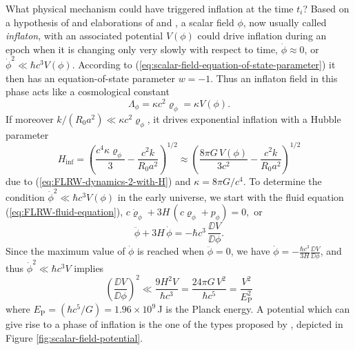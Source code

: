 What physical mechanism could have triggered inflation at the time $t_i$? Based on a hypothesis of \textcite{Guth-1981} and elaborations of \textcite{Linde-1982} and \textcite{Albrecht-Steinhard-1982}, a scalar field $\phi$, now usually called \emph{inflaton}, with an associated potential $V(\phi)$ could drive inflation 
during an epoch when it is changing only very slowly with respect to time, $\dot{\phi} \approx 0$, or $\dot{\phi}^2 \ll \hbar c^3 V(\phi)$. According to (\ref{eq:scalar-field-equation-of-state-parameter}) it then has an equation-of-state parameter $w=-1$. Thus an inflaton field in this phase acts like a cosmological constant
\begin{equation}
	\Lambda_\phi = \kappa c^2 \varrho_\phi = \kappa V(\phi)
	.
\end{equation}
If moreover $k/(R_0 a^2) \ll \kappa c^2 \varrho_\phi$, it drives exponential inflation with a Hubble parameter
\begin{equation}
	H_{\mathrm{inf}}
	= \left( \frac{c^4 \kappa \varrho_\phi}{3} - \frac{c^2 k}{R_0 a^2} \right)^{1/2}
	\approx \left( \frac{8 \pi G \, V(\phi)}{3 c^2} - \frac{c^2 k}{R_0 a^2} \right)^{1/2}
	\label{eq:inflation-Hubble-parameter}
\end{equation}
due to (\ref{eq:FLRW-dynamics-2-with-H}) and $\kappa = 8 \pi G/c^4$.
To determine the condition $\dot{\phi}^2 \ll \hbar c^3 V(\phi)$ in the early universe, we start with the fluid equation (\ref{eq:FLRW-fluid-equation}),
$ %
	c \dot{\varrho}_\phi + 3 H \, (c \varrho_\phi + p_\phi) = 0,
$ %
or
\begin{equation}
	\ddot{\phi} + 3 H \, \dot{\phi} = - \hbar c^3 \, \frac{\DD V}{\DD \phi}.
\end{equation}
Since the maximum value of $\dot{\phi}$ is reached when $\ddot{\phi} = 0$, we have
$\dot{\phi} = - \frac{\hbar c^3}{3 H} \frac{\DD V}{\DD \phi}$, and thus $\dot{\phi}^2 \ll \hbar c^3 V$ implies
\begin{equation}
	\left( \frac{\DD V}{\DD \phi} \right)^2
	\ll
	\frac{9 H^2 V}{\hbar c^3} 
	= \frac{24 \pi G \, V^2}{\hbar c^5}
	= \frac{V^2}{E_{\mathrm{P}}^2}
	\label{eq:inflation-scalar-field-condition}
\end{equation}
where $E_{\mathrm{P}} = (\hbar c^5 / G) = 1.96 \times 10^9$\,J is the Planck energy.
A potential which can give rise to a phase of inflation is the one of the types proposed by \textcite{Albrecht-Steinhard-1982}, depicted in Figure \ref{fig:scalar-field-potential}.

